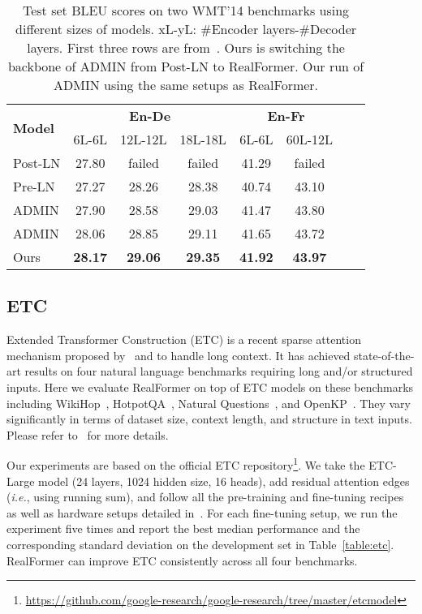 \documentclass[11pt,a4paper]{article}
\begin{document}
\begin{table}
\setlength{\tabcolsep}{2.7pt}
\centering
\begin{tabular}{l|ccc|cccc} \hline
\multirow{2}{*}{\textbf{Model}}    &\multicolumn{3}{c|}{\textbf{En-De}}     &\multicolumn{2}{c}{\textbf{En-Fr}} \\
                          &\small{6L-6L} &\small{12L-12L} &\small{18L-18L}  &\small{6L-6L} &\small{60L-12L}     \\ \hline
Post-LN                   &27.80    &failed     &failed          &41.29   &failed    \\
Pre-LN                    &27.27    &28.26      &28.38           &40.74   &43.10     \\
ADMIN                     &27.90    &28.58      &29.03           &41.47   &43.80     \\ \hline
ADMIN           &28.06    &28.85      &29.11           &41.65   &43.72     \\
Ours                      &\textbf{28.17} &\textbf{29.06}        &\textbf{29.35} &\textbf{41.92}   &\textbf{43.97}     \\  \hline
\end{tabular}
\caption{Test set BLEU scores on two WMT'14 benchmarks using different sizes of models. xL-yL: \#Encoder layers-\#Decoder layers. First three rows are from~\citet{Liu-2020-admin}. Ours is switching the backbone of ADMIN from Post-LN to RealFormer. Our run of ADMIN using the same setups as RealFormer.}
\label{table:nmt}
\end{table}


\subsection{ETC}
Extended Transformer Construction (ETC) is a recent sparse attention mechanism proposed by~\citet{Ainslie-2020-etc} and \citet{Zaheer-2020-bigbird} to handle long context. It has achieved state-of-the-art results on four natural language benchmarks requiring long and/or structured inputs. Here we evaluate RealFormer on top of ETC models on these benchmarks including WikiHop~\citep{Welbl-2018-wikihop}, HotpotQA~\citep{Yang-2018-hotpotqa}, Natural Questions~\citep{Kwiatkowski-2019-nq}, and OpenKP~\citep{Xiong-2019-openkp}. 
They vary significantly in terms of dataset size, context length, and structure in
text inputs. Please refer to~\citet{Ainslie-2020-etc} for more details.

Our experiments are based on the official ETC repository\footnote{\url{https://github.com/google-research/google-research/tree/master/etcmodel}}. We take the ETC-Large model (24 layers, 1024 hidden size, 16 heads), add residual attention edges (\emph{i.e.}, using running sum), and follow all the pre-training and fine-tuning recipes as well as hardware setups detailed in~\citet{Ainslie-2020-etc}.
For each fine-tuning setup, we run the experiment five times and report the best median performance and the corresponding standard deviation on the development set in Table~\ref{table:etc}.
RealFormer can improve ETC consistently across all four benchmarks.
\end{document}
